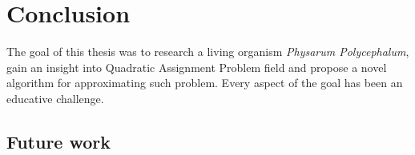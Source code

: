 \chapter{Conclusion}
\label{chapter:conclusion}

The goal of this thesis was to research a living organism \textit{Physarum Polycephalum}, gain an insight into Quadratic Assignment Problem field and propose a novel algorithm for approximating such problem. Every aspect of the goal has been an educative challenge.


\section{Future work}

